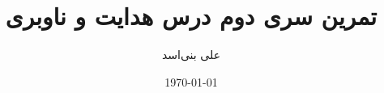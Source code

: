\documentclass[12pt,onecolumn,a4paper]{article}
\begin{document}
	\title{تمرین سری دوم درس هدایت و ناوبری} 
	\author{علی بنی‌اسد}
	\date{\today}
	\maketitle
	
	
	 
	 
	
	\newpage
	\tableofcontents
	\listoffigures
	\listoftables
\end{document}
